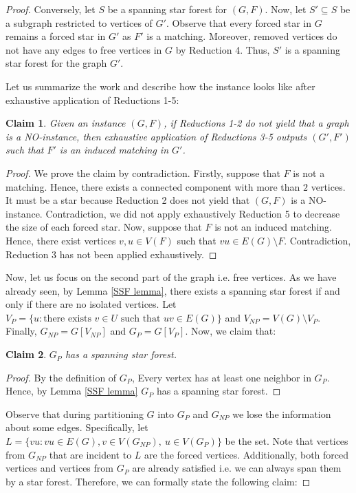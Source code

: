 \documentclass[en]{pracamgr}
\newtheorem{claim}{Claim}
\theoremstyle{definition}
\begin{document}
\begin{proof}
	Conversely, let $S$ be a spanning star forest for $(G,F)$. Now, let $S' \subseteq S$ be a subgraph restricted to vertices of $G'$. Observe that every forced star in $G$ remains a forced star in $G'$ as $F'$ is a matching. Moreover, removed vertices do not have any edges to free vertices in $G$ by Reduction 4. Thus, $S'$ is a spanning star forest for the graph $G'$.

	Let us summarize the work and describe how the instance looks like after exhaustive application of Reductions 1-5:

	\begin{claim}
		Given an instance $(G,F)$, if Reductions 1-2 do not yield that a graph is a NO-instance, then exhaustive application of Reductions 3-5 outputs $(G',F')$ such that $F'$ is an induced matching in $G'$.
	\end{claim}
	
	\begin{proof}
		We prove the claim by contradiction. Firstly, suppose that $F$ is not a matching. Hence, there exists a connected component with more than $2$ vertices. It must be a star because Reduction 2 does not yield that $(G,F)$ is a NO-instance. Contradiction, we did not apply exhaustively Reduction 5 to decrease the size of each forced star. Now, suppose that $F$ is not an induced matching. Hence, there exist vertices $v,u \in V(F)$ such that $vu \in E(G) \setminus F$. Contradiction, Reduction 3 has not been applied exhaustively.
	\end{proof}

	Now, let us focus on the second part of the graph i.e. free vertices. As we have already seen, by Lemma \ref{SSF lemma}, there exists a spanning star forest if and only if there are no isolated vertices. Let $V_P = \{u: \text{there exists } v\in U \text{ such that }uv \in E(G)\}$ and $V_{NP} = V(G) \setminus V_P$. Finally, $G_{NP} = G[V_{NP}]$ and $G_P = G[V_P]$. Now, we claim that:

	\begin{claim}\label{GP partition}
		$G_P$ has a spanning star forest.
	\end{claim}
	
	\begin{proof}
		By the definition of $G_P$, Every vertex has at least one neighbor in $G_P$. Hence, by Lemma \ref{SSF lemma} $G_P$ has a spanning star forest.
	\end{proof}

	Observe that during partitioning $G$ into $G_P$ and $G_{NP}$ we lose the information about some edges. Specifically, let $L= \{vu: vu \in E(G), v \in V(G_{NP}),\ u \in V(G_P)\}$ be the set. Note that vertices from $G_{NP}$ that are incident to $L$ are the forced vertices. Additionally, both forced vertices and vertices from $G_P$ are already satisfied i.e. we can always span them by a star forest. Therefore, we can formally state the following claim:
	

\end{proof}
\end{document}
